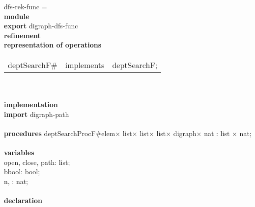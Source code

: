 \begin{tabbing}
dfs-rek-func = \\
{\bf mod}\={\bf ule}\+\\
{\bf export} digraph-dfs-func\\
{\bf ref}\={\bf inement}\+\\
{\bf rep}\= {\bf resentation of operations}\+\\
\begin{tabular}{lcl}
deptSearchF\# & implements & deptSearchF;
\end{tabular}\-\\

\\
{\bf implementation}\\
{\bf import} digraph-path\\
\\
{\bf procedures} deptSearchProcF\#elem$\times$ list$\times$ list$\times$ list$\times$ digraph$\times$ nat : list $\times$ nat;\\
\\
{\bf vari}\={\bf ables}\+\\
open, close, path: list;\\
bbool: bool;\\
n, : nat;
\-\\
\\

               {\bf declaration}
\end{tabbing}

